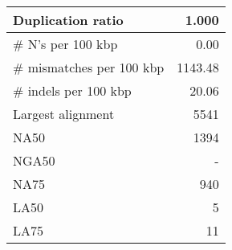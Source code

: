 \documentclass[12pt,a4paper]{article}
\begin{document}
\begin{table}[ht]
\begin{center}
\begin{tabular}{|l*{1}{|r}|}
Duplication ratio & 1.000 \\ \hline
\# N's per 100 kbp & 0.00 \\ \hline
\# mismatches per 100 kbp & 1143.48 \\ \hline
\# indels per 100 kbp & 20.06 \\ \hline
Largest alignment & 5541 \\ \hline
NA50 & 1394 \\ \hline
NGA50 & - \\ \hline
NA75 & 940 \\ \hline
LA50 & 5 \\ \hline
LA75 & 11 \\ \hline
\end{tabular}
\end{center}
\end{table}
\end{document}
